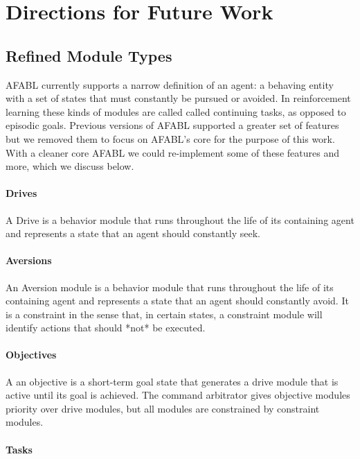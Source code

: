 \section{Directions for Future Work}


\subsection{Refined Module Types}

AFABL currently supports a narrow definition of an agent: a behaving entity with a set of states that must constantly be pursued or avoided. In reinforcement learning these kinds of modules are called called continuing tasks, as opposed to episodic goals. Previous versions of AFABL supported a greater set of features but we removed them to focus on AFABL's core for the purpose of this work. With a cleaner core AFABL we could re-implement some of these features and more, which we discuss below.

\paragraph{Drives}

A Drive is a behavior module that runs throughout the life of its containing agent and represents a state that an agent should constantly seek.

\paragraph{Aversions}

An Aversion module is a behavior module that runs throughout the life of its containing agent and represents a state that an agent should constantly avoid.  It is a constraint in the sense that, in certain states, a constraint module will identify actions that should *not* be executed.

\paragraph{Objectives}

A an objective is a short-term goal state that generates a drive module that is active until its goal is achieved.  The command arbitrator gives objective modules priority over drive modules, but all modules are constrained by constraint modules.

\paragraph{Tasks}

